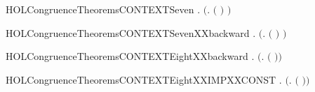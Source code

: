 \begin{SaveVerbatim}{HOLCongruenceTheoremsCONTEXTSeven}
\HOLTokenTurnstile{} \HOLSymConst{\HOLTokenForall{}} .   \HOLSymConst{\HOLTokenImp{}}  \ensuremath{(}\HOLTokenLambda{}.  \ensuremath{(} \ensuremath{)} \ensuremath{)}
\end{SaveVerbatim}
\newcommand{\HOLCongruenceTheoremsCONTEXTSeven}{\UseVerbatim{HOLCongruenceTheoremsCONTEXTSeven}}
\begin{SaveVerbatim}{HOLCongruenceTheoremsCONTEXTSevenXXbackward}
\HOLTokenTurnstile{} \HOLSymConst{\HOLTokenForall{}} .  \ensuremath{(}\HOLTokenLambda{}.  \ensuremath{(} \ensuremath{)} \ensuremath{)} \HOLSymConst{\HOLTokenImp{}}  
\end{SaveVerbatim}
\newcommand{\HOLCongruenceTheoremsCONTEXTSevenXXbackward}{\UseVerbatim{HOLCongruenceTheoremsCONTEXTSevenXXbackward}}
\begin{SaveVerbatim}{HOLCongruenceTheoremsCONTEXTEightXXbackward}
\HOLTokenTurnstile{} \HOLSymConst{\HOLTokenForall{}} .  \ensuremath{(}\HOLTokenLambda{}.   \ensuremath{(} \ensuremath{)}\ensuremath{)} \HOLSymConst{\HOLTokenImp{}}  
\end{SaveVerbatim}
\newcommand{\HOLCongruenceTheoremsCONTEXTEightXXbackward}{\UseVerbatim{HOLCongruenceTheoremsCONTEXTEightXXbackward}}
\begin{SaveVerbatim}{HOLCongruenceTheoremsCONTEXTEightXXIMPXXCONST}
\HOLTokenTurnstile{} \HOLSymConst{\HOLTokenForall{}} .  \ensuremath{(}\HOLTokenLambda{}.   \ensuremath{(} \ensuremath{)}\ensuremath{)} \HOLSymConst{\HOLTokenImp{}}  
\end{SaveVerbatim}
\newcommand{\HOLCongruenceTheoremsCONTEXTEightXXIMPXXCONST}{\UseVerbatim{HOLCongruenceTheoremsCONTEXTEightXXIMPXXCONST}}
